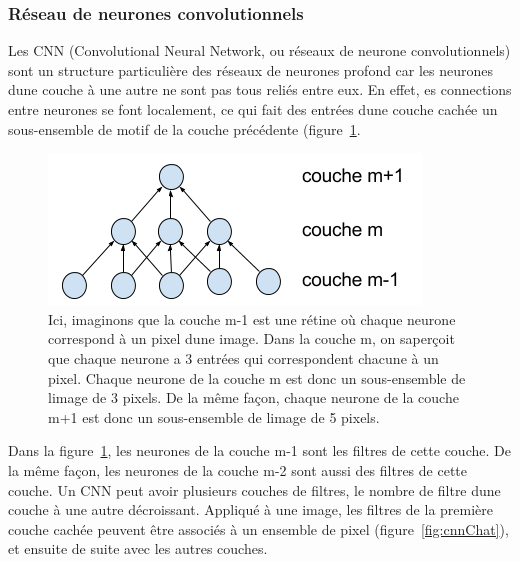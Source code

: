 \documentclass[11pt]{sdm}
\begin{document}
		\subsubsection{R\'eseau de neurones convolutionnels}
		\label{seq:CNN}
			Les CNN (Convolutional Neural Network, ou r\'eseaux de neurone convolutionnels) sont un structure particuli\`ere des r\'eseaux de neurones profond car les neurones d\textquotesingle une couche \`a une autre ne sont pas tous reli\'es entre eux. En effet, es connections entre neurones se font localement, ce qui fait des entr\'ees d\textquotesingle une couche cach\'ee un sous-ensemble de motif de la couche pr\'ec\'edente (figure~\ref{fig:cnn}.

			\begin{figure}[!ht]
				\centering
				\includegraphics[natwidth=375,natheight=152]{figures/architectureCNN.png}
				\caption{Ici, imaginons que la couche m-1 est une r\'etine o\`u chaque neurone correspond \`a un pixel d\textquotesingle une image. Dans la couche m, on s\textquotesingle aper\c coit que chaque neurone a 3 entr\'ees qui correspondent chacune \`a un pixel. Chaque neurone de la couche m est donc un sous-ensemble de l\textquotesingle image de 3 pixels. De la m\^eme fa\c con, chaque neurone de la couche m+1 est donc un sous-ensemble de l\textquotesingle image de 5 pixels.}
				\label{fig:cnn}
			\end{figure}

			Dans la figure~\ref{fig:cnn}, les neurones de la couche m-1 sont les filtres de cette couche. De la m\^eme fa\c con, les neurones de la couche m-2 sont aussi des filtres de cette couche. Un CNN peut avoir plusieurs couches de filtres, le nombre de filtre d\textquotesingle une couche \`a une autre d\'ecroissant.
			Appliqu\'e \`a une image, les filtres de la premi\`ere couche cach\'ee peuvent \^etre associ\'es \`a un ensemble de pixel (figure~\ref{fig:cnnChat}), et ensuite de suite avec les autres couches.
\end{document}
